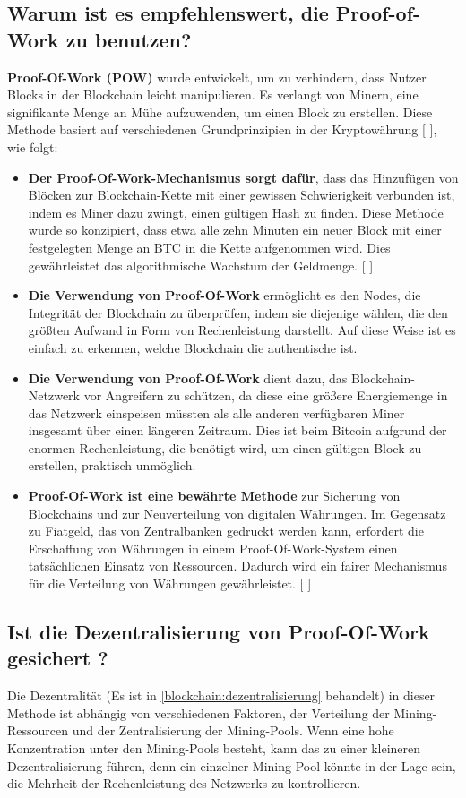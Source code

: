 \documentclass[ngerman]{scrreprt}
\begin{document}
\subsection{Warum ist es empfehlenswert, die Proof-of-Work zu benutzen?}
\textbf{Proof-Of-Work (POW)} wurde entwickelt, um zu verhindern, dass Nutzer Blocks in der Blockchain leicht manipulieren. Es verlangt von Minern, eine signifikante Menge an Mühe aufzuwenden, um einen Block zu erstellen. Diese Methode basiert auf verschiedenen Grundprinzipien in der Kryptowährung [ \cite{proof_of_work_wikipedia} ], wie folgt:

\begin{itemize}
	\item \textbf{Der Proof-Of-Work-Mechanismus sorgt dafür}, dass das Hinzufügen von Blöcken zur Blockchain-Kette mit einer gewissen Schwierigkeit verbunden ist, indem es Miner dazu zwingt, einen gültigen Hash zu finden. Diese Methode wurde so konzipiert, dass etwa alle zehn Minuten ein neuer Block mit einer festgelegten Menge an BTC in die Kette aufgenommen wird. Dies gewährleistet das algorithmische Wachstum der Geldmenge. [ \cite{btc-echo-proof-of-work} ]
	\item \textbf{Die Verwendung von Proof-Of-Work} ermöglicht es den Nodes, die Integrität der Blockchain zu überprüfen, indem sie diejenige wählen, die den größten Aufwand in Form von Rechenleistung darstellt. Auf diese Weise ist es einfach zu erkennen, welche Blockchain die authentische ist.
	\item \textbf{Die Verwendung von Proof-Of-Work} dient dazu, das Blockchain-Netzwerk vor Angreifern zu schützen, da diese eine größere Energiemenge in das Netzwerk einspeisen müssten als alle anderen verfügbaren Miner insgesamt über einen längeren Zeitraum. Dies ist beim Bitcoin aufgrund der enormen Rechenleistung, die benötigt wird, um einen gültigen Block zu erstellen, praktisch unmöglich.
	\item \textbf{Proof-Of-Work ist eine bewährte Methode} zur Sicherung von Blockchains und zur Neuverteilung von digitalen Währungen. Im Gegensatz zu Fiatgeld, das von Zentralbanken gedruckt werden kann, erfordert die Erschaffung von Währungen in einem Proof-Of-Work-System einen tatsächlichen Einsatz von Ressourcen. Dadurch wird ein fairer Mechanismus für die Verteilung von Währungen gewährleistet. [ \cite{btc-echo-proof-of-work} ]
\end{itemize}

\subsection{Ist die Dezentralisierung von Proof-Of-Work gesichert ?}
Die Dezentralität (Es ist in \cref{blockchain:dezentralisierung} behandelt) in dieser Methode ist abhängig von verschiedenen Faktoren,   der Verteilung der Mining-Ressourcen und der Zentralisierung der Mining-Pools. Wenn eine hohe Konzentration unter den Mining-Pools besteht, kann das zu einer kleineren Dezentralisierung führen, denn ein einzelner Mining-Pool könnte in der Lage sein, die Mehrheit der Rechenleistung des Netzwerks zu kontrollieren.
\end{document}
